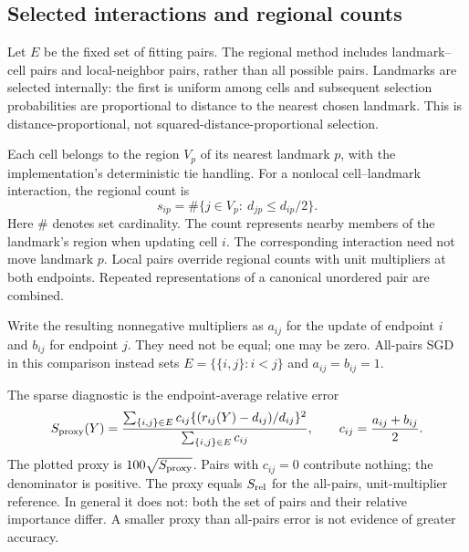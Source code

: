 \documentclass[11pt]{article}
\begin{document}
\subsection{Selected interactions and regional counts}
Let $E$ be the fixed set of fitting pairs. The regional method includes
landmark--cell pairs and local-neighbor pairs, rather than all possible pairs.
Landmarks are selected internally: the first is uniform among cells and
subsequent selection probabilities are proportional to distance to the
nearest chosen landmark. This is distance-proportional, not
squared-distance-proportional selection.

Each cell belongs to the region $V_p$ of its nearest landmark $p$, with the
implementation's deterministic tie handling. For a nonlocal cell--landmark
interaction, the regional count is
\begin{equation}
s_{ip}=\#\{j\in V_p:\ d_{jp}\leq d_{ip}/2\}.
\end{equation}
Here $\#$ denotes set cardinality. The count represents nearby members of the
landmark's region when updating cell $i$. The corresponding interaction need
not move landmark $p$. Local pairs override regional counts with unit
multipliers at both endpoints. Repeated representations of a canonical
unordered pair are combined.

Write the resulting nonnegative multipliers as $a_{ij}$ for the update of
endpoint $i$ and $b_{ij}$ for endpoint $j$. They need not be equal; one may
be zero. All-pairs SGD in this comparison instead sets
$E=\{\{i,j\}:i<j\}$ and $a_{ij}=b_{ij}=1$.

The sparse diagnostic is the endpoint-average relative error
\begin{equation}\label{eq:proxy}
S_{\rm proxy}(Y)=
\frac{\sum_{\{i,j\}\in E} c_{ij}
       \{(r_{ij}(Y)-d_{ij})/d_{ij}\}^2}
     {\sum_{\{i,j\}\in E}c_{ij}},
\qquad c_{ij}=\frac{a_{ij}+b_{ij}}2.
\end{equation}
The plotted proxy is $100\sqrt{S_{\rm proxy}}$. Pairs with $c_{ij}=0$
contribute nothing; the denominator is positive. The proxy equals
$S_{\rm rel}$ for the all-pairs, unit-multiplier reference. In general it
does not: both the set of pairs and their relative importance differ.
A smaller proxy than all-pairs error is not evidence of greater accuracy.
\end{document}
